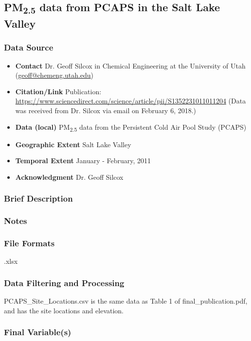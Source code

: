 \subsection{\texorpdfstring{PM\textsubscript{2.5}}{} data from PCAPS in the Salt Lake Valley}

\subsubsection*{Data Source}

\begin{itemize}[nolistsep]
\item \textbf{Contact} Dr. Geoff Silcox in Chemical Engineering at the University of Utah (\url{geoff@chemeng.utah.edu})
\item \textbf{Citation/Link} Publication: \url{https://www.sciencedirect.com/science/article/pii/S1352231011011204} (Data was received from Dr. Silcox via email on February 6, 2018.)
\item \textbf{Data (local)} PM\textsubscript{2.5} data from the Persistent Cold Air Pool Study (PCAPS)
\item \textbf{Geographic Extent} Salt Lake Valley
\item \textbf{Temporal Extent} January - February, 2011
\item \textbf{Acknowledgment} Dr. Geoff Silcox
\end{itemize}

\subsubsection*{Brief Description}

\subsubsection*{Notes}

\subsubsection*{File Formats} 
.xlsx

\subsubsection*{Data Filtering and Processing}

PCAPS\_Site\_Locations.csv is the same data as Table 1 of final\_publication.pdf, and has the site locations and elevation.

\subsubsection*{Final Variable(s)}

